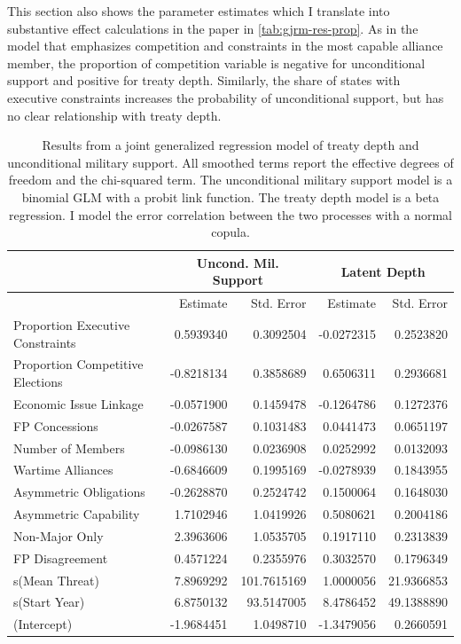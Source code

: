 \documentclass[12pt]{article}
\begin{document}
This section also shows the parameter estimates which I translate into substantive effect calculations in the paper in \autoref{tab:gjrm-res-prop}. 
As in the model that emphasizes competition and constraints in the most capable alliance member, the proportion of competition variable is negative for unconditional support and positive for treaty depth. 
Similarly, the share of states with executive constraints increases the probability of unconditional support, but has no clear relationship with treaty depth. 


\begin{table}[ht]
\centering
\begin{tabular}{lrrrr}
  & \multicolumn{2}{c}{Uncond. Mil. Support} & \multicolumn{2}{c}{Latent Depth}\\ \hline
 & Estimate & Std. Error & Estimate & Std. Error \\ 
  \hline
  Proportion Executive Constraints & 0.5939340 & 0.3092504 & -0.0272315 & 0.2523820 \\ 
  Proportion Competitive Elections & -0.8218134 & 0.3858689 & 0.6506311 & 0.2936681 \\ 
  Economic Issue Linkage & -0.0571900 & 0.1459478 & -0.1264786 & 0.1272376 \\ 
  FP Concessions & -0.0267587 & 0.1031483 & 0.0441473 & 0.0651197 \\ 
  Number of Members & -0.0986130 & 0.0236908 & 0.0252992 & 0.0132093 \\ 
  Wartime Alliances & -0.6846609 & 0.1995169 & -0.0278939 & 0.1843955 \\ 
  Asymmetric Obligations & -0.2628870 & 0.2524742 & 0.1500064 & 0.1648030 \\ 
  Asymmetric Capability & 1.7102946 & 1.0419926 & 0.5080621 & 0.2004186 \\ 
  Non-Major Only & 2.3963606 & 1.0535705 & 0.1917110 & 0.2313839 \\ 
  FP Disagreement & 0.4571224 & 0.2355976 & 0.3032570 & 0.1796349 \\ 
  s(Mean Threat) & 7.8969292 & 101.7615169 & 1.0000056 & 21.9366853 \\ 
  s(Start Year) & 6.8750132 & 93.5147005 & 8.4786452 & 49.1388890 \\ 
  (Intercept) & -1.9684451 & 1.0498710 & -1.3479056 & 0.2660591 \\ 
   \hline
\end{tabular}
\caption{Results from a joint generalized regression model of treaty depth and unconditional military support. 
                     All smoothed terms report the effective degrees of freedom and the chi-squared term. 
                     The unconditional military support model is a binomial GLM with a probit link function. 
                     The treaty depth model is a beta regression. 
                     I model the error correlation between the two processes with a normal copula.} 
\label{tab:gjrm-res-prop}
\end{table}
\end{document}
